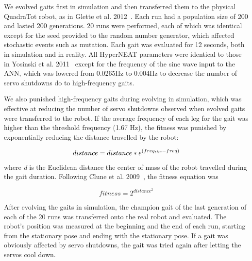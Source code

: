 We evolved gaits first in simulation and then transferred them to the physical QuadraTot robot, as in Glette et al. 2012~\cite{glette}. 
Each run had a population size of 200 and lasted 200 generations. 20 runs were performed, each of which was identical except for the seed provided to the random number generator, which affected stochastic events such as mutation. 
Each gait was evaluated for 12 seconds, both in simulation and in reality. 
All HyperNEAT parameters were identical to those in Yosinski et al. 2011~\cite{yos:clune} except for the frequency of the sine wave input to the ANN, which was lowered from 0.0265Hz to 0.004Hz to decrease the number of servo shutdowns do to high-frequency gaits. 


%
%

We also punished high-frequency gaits during evolving in simulation, which was effective at reducing the number of servo shutdowns observed when evolved gaits were transferred to the robot. 
If the average frequency of each leg for the gait was higher than the threshold frequency (1.67 Hz), the fitness was punished by exponentially reducing the distance travelled by the robot:

\begin{equation}
distance = distance*e^{(freq_{thr}-freq)} \\
\end{equation}

\noindent where \emph{d} is the Euclidean distance the center of mass of the robot travelled during the gait duration. Following Clune et al. 2009~\cite{clune2009evolving}, the fitness equation was 

\begin{equation}
fitness = 2^{distance^{2}}
\end{equation}

After evolving the gaits in simulation, the champion gait of the last generation of each of the 20 runs was transferred onto the real robot and evaluated.
The robot's position was measured at the beginning and the end of each run, starting from the stationary pose and ending with the stationary pose. 
If a gait was obviously affected by servo shutdowns, the gait was tried again after letting the servos cool down. 

